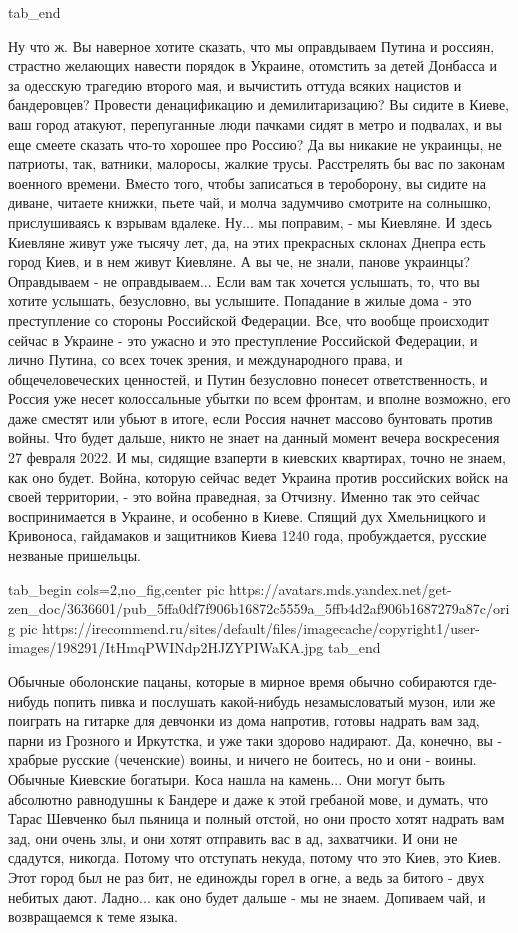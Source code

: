   tab_end
\fi

Ну что ж. Вы наверное хотите сказать, что мы оправдываем Путина и россиян,
страстно желающих навести порядок в Украине, отомстить за детей Донбасса и за
одесскую трагедию второго мая, и вычистить оттуда всяких нацистов и
бандеровцев? Провести денацификацию и демилитаризацию? Вы сидите в Киеве, ваш
город атакуют, перепуганные люди пачками сидят в метро и подвалах, и вы еще
смеете сказать что-то хорошее про Россию? Да вы никакие не украинцы, не
патриоты, так, ватники, малоросы, жалкие трусы. Расстрелять бы вас по законам
военного времени. Вместо того, чтобы записаться в тероборону, вы сидите на
диване, читаете книжки, пьете чай, и молча задумчиво смотрите на солнышко,
прислушиваясь к взрывам вдалеке.  Ну...  мы поправим, - мы Киевляне.  И здесь
Киевляне живут уже тысячу лет, да, на этих прекрасных склонах Днепра есть город
Киев, и в нем живут Киевляне.  А вы че, не знали, панове украинцы?  Оправдываем
- не оправдываем... Если вам так хочется услышать, то, что вы хотите услышать,
безусловно, вы услышите.  Попадание в жилые дома - это преступление со стороны
Российской Федерации.  Все, что вообще происходит сейчас в Украине - это ужасно
и это преступление Российской Федерации, и лично Путина, со всех точек зрения,
и международного права, и общечеловеческих ценностей, и Путин безусловно
понесет ответственность, и Россия уже несет колоссальные убытки по всем
фронтам, и вполне возможно, его даже сместят или убьют в итоге, если Россия
начнет массово бунтовать против войны. Что будет дальше, никто не знает на
данный момент вечера воскресения 27 февраля 2022. И мы, сидящие взаперти в
киевских квартирах, точно не знаем, как оно будет. Война, которую сейчас ведет
Украина против российских войск на своей территории, - это война праведная, за
Отчизну. Именно так это сейчас воспринимается в Украине, и особенно в Киеве.
Спящий дух Хмельницкого и Кривоноса, гайдамаков и защитников Киева 1240 года,
пробуждается, русские незваные пришельцы. 

\ifcmt
  tab_begin cols=2,no_fig,center
     pic https://avatars.mds.yandex.net/get-zen_doc/3636601/pub_5ffa0df7f906b16872c5559a_5ffb4d2af906b1687279a87c/orig
     pic https://irecommend.ru/sites/default/files/imagecache/copyright1/user-images/198291/ItHmqPWINdp2HJZYPIWaKA.jpg
  tab_end
\fi

Обычные оболонские пацаны, которые в мирное время обычно собираются где-нибудь
попить пивка и послушать какой-нибудь незамысловатый музон, или же поиграть на
гитарке для девчонки из дома напротив, готовы надрать вам зад, парни из
Грозного и Иркутстка, и уже таки здорово надирают. Да, конечно, вы - храбрые
русские (чеченские) воины, и ничего не боитесь, но и они - воины. Обычные
Киевские богатыри. Коса нашла на камень...  Они могут быть абсолютно равнодушны
к Бандере и даже к этой гребаной мове, и думать, что Тарас Шевченко был пьяница
и полный отстой, но они просто хотят надрать вам зад, они очень злы, и они
хотят отправить вас в ад, захватчики. И они не сдадутся, никогда. Потому что
отступать некуда, потому что это Киев, это Киев. Этот город был не раз бит, не
единожды горел в огне, а ведь за битого - двух небитых дают. Ладно... как оно
будет дальше - мы не знаем. Допиваем чай, и возвращаемся к теме языка.

